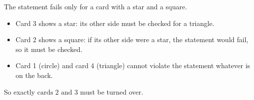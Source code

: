 The statement fails only for a card with a star and a square.
\begin{itemize}
\item Card 3 shows a star: its other side must be checked for a triangle.
\item Card 2 shows a square: if its other side were a star, the statement would fail, so it must be checked.
\item Card 1 (circle) and card 4 (triangle) cannot violate the statement whatever is on the back.
\end{itemize}
So exactly $\boxed{\text{cards 2 and 3}}$ must be turned over.

